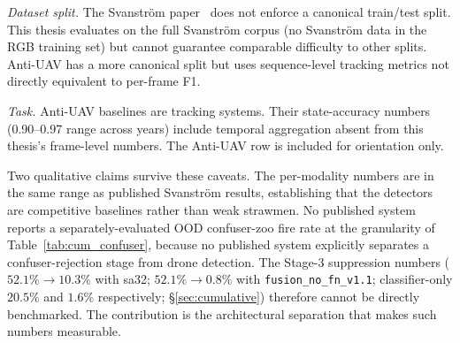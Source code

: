 \emph{Dataset split.} The Svanstr\"om paper~\cite{svanstrom2021real} does not enforce a canonical train/test split. This thesis evaluates on the full Svanstr\"om corpus (no Svanstr\"om data in the RGB training set) but cannot guarantee comparable difficulty to other splits. Anti-UAV has a more canonical split but uses sequence-level tracking metrics not directly equivalent to per-frame F1.

\emph{Task.} Anti-UAV baselines are tracking systems. Their state-accuracy numbers (0.90--0.97 range across years) include temporal aggregation absent from this thesis's frame-level numbers. The Anti-UAV row is included for orientation only.

Two qualitative claims survive these caveats. The per-modality numbers are in the same range as published Svanstr\"om results, establishing that the detectors are competitive baselines rather than weak strawmen. No published system reports a separately-evaluated OOD confuser-zoo fire rate at the granularity of Table~\ref{tab:cum_confuser}, because no published system explicitly separates a confuser-rejection stage from drone detection. The Stage-3 suppression numbers ($52.1\% \to 10.3\%$ with sa32; $52.1\% \to 0.8\%$ with \texttt{fusion\_no\_fn\_v1.1}; classifier-only $20.5\%$ and $1.6\%$ respectively; \S\ref{sec:cumulative}) therefore cannot be directly benchmarked. The contribution is the architectural separation that makes such numbers measurable.

